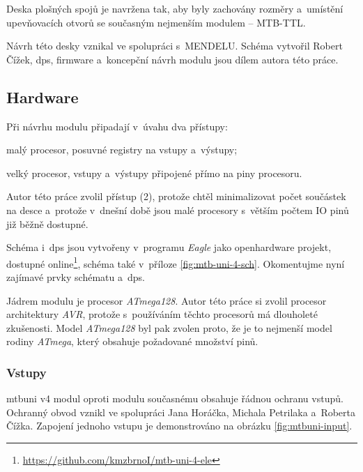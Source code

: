 Deska plošných spojů je navržena tak, aby byly zachovány rozměry a~umístění
upevňovacích otvorů se současným nejmenším modulem – MTB-TTL.

Návrh této desky vznikal ve spolupráci s~MENDELU. Schéma vytvořil Robert Čížek,
\gls{dps}, firmware a~koncepční návrh modulu jsou dílem autora této práce.


\subsection{Hardware}

Při návrhu modulu připadají v~úvahu dva přístupy:

\begin{compactenum}
\item malý procesor, posuvné registry na vstupy a~výstupy;
\item velký procesor, vstupy a~výstupy připojené přímo na piny procesoru.
\end{compactenum}

Autor této práce zvolil přístup (2), protože chtěl minimalizovat počet
součástek na desce a~protože v~dnešní době jsou malé procesory s~větším počtem
IO pinů již běžně dostupné.

Schéma i~\gls{dps} jsou vytvořeny v~programu \textit{Eagle} jako openhardware
projekt, dostupné
online\footnote{\url{https://github.com/kmzbrnoI/mtb-uni-4-ele}}, schéma také
v~příloze \ref{fig:mtb-uni-4-sch}. Okomentujme nyní zajímavé prvky schématu
a~\gls{dps}.

Jádrem modulu je procesor \textit{ATmega128}. Autor této práce si zvolil
procesor architektury \textit{AVR}, protože s~používáním těchto procesorů má
dlouholeté zkušenosti. Model \textit{ATmega128} byl pak zvolen proto, že je to
nejmenší model rodiny \textit{ATmega}, který obsahuje požadované množství pinů.

\subsubsection{\textbf{Vstupy}}

\gls{mtbuni} v4 modul oproti modulu současnému obsahuje řádnou ochranu vstupů.
Ochranný obvod vznikl ve spolupráci Jana Horáčka, Michala Petrilaka a~Roberta
Čížka. Zapojení jednoho vstupu je demonstrováno na obrázku \ref{fig:mtbuni-input}.

